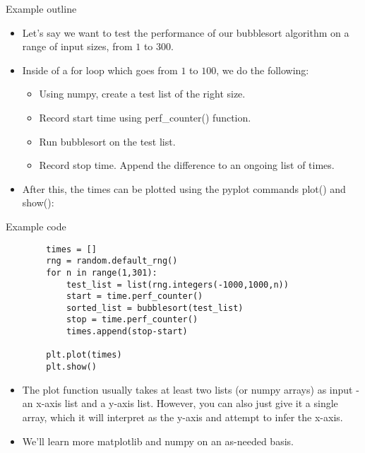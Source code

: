 \documentclass{beamer}
\begin{document}
\begin{frame}[fragile]{Example outline}
    \begin{itemize}
        \item Let's say we want to test the performance of our bubblesort algorithm on a range of input sizes, from $1$ to $300$.
        \item Inside of a for loop which goes from $1$ to $100$, we do the following:
        \begin{itemize} 
            \item Using numpy, create a test list of the right size.
            \item Record start time using perf\_counter() function.
            \item Run bubblesort on the test list. 
            \item Record stop time. Append the difference to an ongoing list of times.
        \end{itemize}
        \item After this, the times can be plotted using the pyplot commands plot() and show():
    \end{itemize}
\end{frame}

\begin{frame}[fragile]{Example code}
    \begin{verbatim}
        times = []
        rng = random.default_rng()
        for n in range(1,301):
	        test_list = list(rng.integers(-1000,1000,n))
	        start = time.perf_counter()
	        sorted_list = bubblesort(test_list)
	        stop = time.perf_counter()
	        times.append(stop-start)

        plt.plot(times)
        plt.show()
    \end{verbatim}
    \begin{itemize}
        \item The plot function usually takes at least two lists (or numpy arrays) as input - an x-axis list and a y-axis list. However, you can also just give it a single array, which it will interpret as the y-axis and attempt to infer the x-axis. 
        \item We'll learn more matplotlib and numpy on an as-needed basis.
    \end{itemize}
\end{frame}
\end{document}
